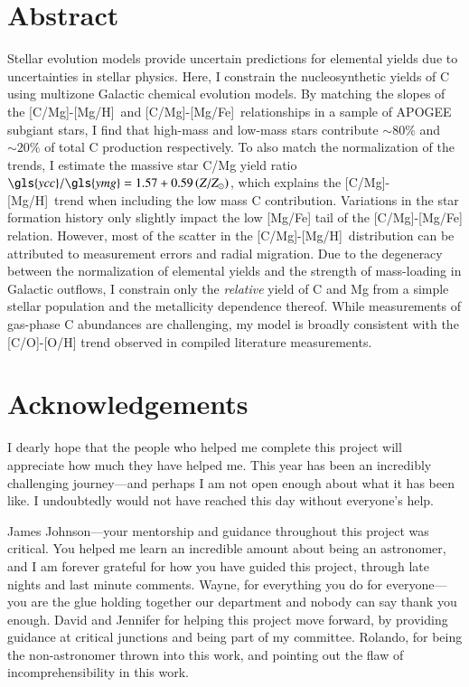\documentclass[12pt,oneside,letterpaper]{report}
\newcommand{\Ycc}{\gls{ycc}}
\newcommand{\Yoc}{\gls{ymg}}
\newcommand{\caah}{[C/Mg]-[Mg/H]}
\newcommand{\caafe}{[C/Mg]-[Mg/Fe]}
\newcommand{\about}[1]{${\sim} #1$}
\begin{document}
\chapter*{Abstract}
Stellar evolution models provide uncertain predictions for elemental yields due to uncertainties in stellar physics.
Here, I constrain the nucleosynthetic yields of C using multizone Galactic chemical evolution models.
By matching the slopes of the \caah\ and \caafe\ relationships in a sample of APOGEE subgiant stars, I find that high-mass and low-mass stars contribute \about{80\%} and \about{20\%} of total C production respectively.
% 
To also match the normalization of the trends, I estimate the massive star C/Mg yield ratio $\Ycc/\Yoc = 1.57 + 0.59 \left(Z/Z_\odot\right)$, which explains the \caah\ trend when including the low mass C contribution.
%
Variations in the star formation history only slightly impact the low [Mg/Fe] tail of the [C/Mg]-[Mg/Fe] relation. However, most of the scatter in the \caah\ distribution can be attributed to measurement errors and radial migration. 
% 
Due to the degeneracy between the normalization of elemental yields and the strength of mass-loading in Galactic outflows, I constrain only the {\it relative} yield of C and Mg from a simple stellar population and the metallicity dependence thereof. While measurements of gas-phase C abundances are challenging, my model is broadly consistent with the [C/O]-[O/H] trend observed in compiled literature measurements.





\chapter*{Acknowledgements}


I dearly hope that the people who helped me complete this project will appreciate how much they have helped me. This year has been an incredibly challenging journey---and perhaps I am not open enough about what it has been like. I undoubtedly would not have reached this day without everyone's help.

James Johnson---your mentorship and guidance throughout this project was critical. 
You helped me learn an incredible amount about being an astronomer, and I am forever grateful for how you have guided this project, through late nights and last minute comments.  Wayne, for everything you do for everyone---you are the glue holding together our department and nobody can say thank you enough. 
David and Jennifer for helping this project move forward, by providing guidance at critical junctions and being part of my committee. Rolando, for being the non-astronomer thrown into this work, and pointing out the flaw of incomprehensibility in this work.
\end{document}
